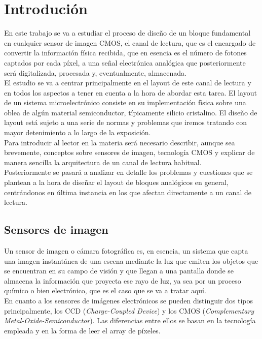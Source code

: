 \chapter{Introdución}\label{cap:intro}

En este trabajo se va a estudiar el proceso de diseño de un bloque fundamental
en cualquier sensor de imagen CMOS, el canal de lectura, que es el encargado
de convertir la información física recibida, que en esencia es el número de fotones
captados por cada píxel, a una señal electrónica analógica que posteriormente será digitalizada,
procesada y, eventualmente, almacenada.\\

El estudio se va a centrar principalmente en el layout de este canal de
lectura y en todos los aspectos a tener en cuenta a la hora de abordar esta tarea.
El layout de un sistema microelectrónico consiste en su implementación física
sobre una oblea de algún material semiconductor, típicamente silicio cristalino. El
diseño de layout está sujeto a una serie de normas y problemas que iremos tratando
con mayor detenimiento a lo largo de la exposición.\\

Para introducir al lector en la materia será necesario describir, aunque sea
brevemente, conceptos sobre sensores de imagen, tecnología CMOS y explicar de manera
sencilla la arquitectura de un canal de lectura habitual.\\

Posteriormente se pasará a analizar en detalle los problemas y cuestiones que se
plantean a la hora de diseñar el layout de bloques analógicos en general,
centrándonos en última instancia en los que afectan directamente a un canal de lectura.\\

\section{Sensores de imagen}\label{cap:image_sensors}

Un sensor de imagen o cámara fotográfica es, en esencia, un sistema que capta
una imagen instantánea de una escena mediante la luz que emiten los objetos que
se encuentran en su campo de visión y que llegan a una pantalla donde se almacena
la información que proyecta ese rayo de luz, ya sea por un proceso químico
o bien electrónico, que es el caso que se va a tratar aquí.\\

En cuanto a los sensores de imágenes electrónicos se pueden distinguir dos tipos
principalmente, los CCD (\textit{Charge-Coupled Device}) y los CMOS
(\textit{Complementary Metal-Oxide-Semiconductor}). Las diferencias entre ellos
se basan en la tecnología empleada y en la forma de leer el array de píxeles.
\cite{Moini2010}\cite{Nakamura2005}\\

